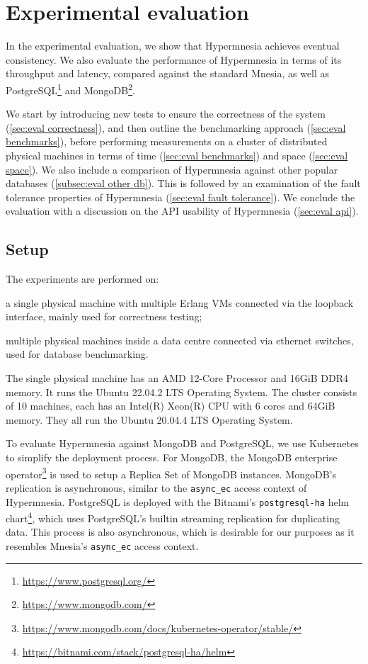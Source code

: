 \section{Experimental evaluation} \label{sec:eval}

In the experimental evaluation, we show that Hypermnesia achieves eventual consistency.
We also evaluate the performance of Hypermnesia in terms of its throughput and latency,
compared against the standard Mnesia, as well as 
PostgreSQL\footnote{\url{https://www.postgresql.org/}} and 
MongoDB\footnote{\url{https://www.mongodb.com/}}.

We start by introducing new tests to ensure
the correctness of the system (\cref{sec:eval correctness}), and then outline
the benchmarking approach (\cref{sec:eval benchmarks}), before performing 
measurements on a cluster of distributed physical machines in terms of
time (\cref{sec:eval benchmarks}) and space (\cref{sec:eval space}).
We also include a comparison of Hypermnesia against other popular 
databases (\cref{subsec:eval other db}).
This is followed by an examination of the fault tolerance properties of Hypermnesia
(\cref{sec:eval fault tolerance}).
We conclude the evaluation with a discussion on the API usability of 
Hypermnesia (\cref{sec:eval api}).

\subsection{Setup}

The experiments are performed on:
\begin{enumerate*}[(a)]
  \item a single physical machine with multiple Erlang VMs connected via the loopback 
  interface, mainly used for correctness testing;
  \item multiple physical machines inside a data centre connected via ethernet
  switches, used for database benchmarking.
\end{enumerate*}

The single physical machine has an AMD 12-Core Processor and 16GiB DDR4 memory. 
It runs the Ubuntu 22.04.2 LTS Operating System. The cluster consists
of 10 machines, each has an Intel(R) Xeon(R) CPU with 6 cores and 64GiB memory.
They all run the Ubuntu 20.04.4 LTS Operating System.


To evaluate Hypermnesia against MongoDB and PostgreSQL, we use Kubernetes to simplify
the deployment process. For MongoDB, the MongoDB enterprise 
operator\footnote{\url{https://www.mongodb.com/docs/kubernetes-operator/stable/}} is used
to setup a Replica Set of MongoDB instances. MongoDB's replication is asynchronous,
similar to the \verb|async_ec| access context of Hypermnesia. PostgreSQL is deployed 
with the Bitnami's \texttt{postgresql-ha} helm 
chart\footnote{\url{https://bitnami.com/stack/postgresql-ha/helm}}, which uses 
PostgreSQL's builtin
streaming replication for duplicating data. This process is also asynchronous, which
is desirable for our purposes as it resembles Mnesia's \verb|async_ec| access context.


